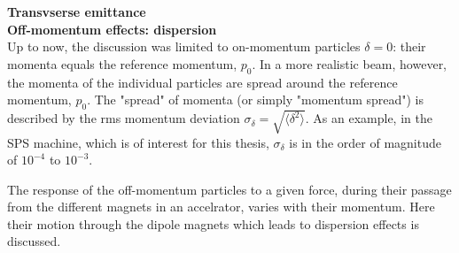 



\textbf{Transvserse emittance}\\
\textbf{Off-momentum effects: dispersion}\\
Up to now, the discussion was limited to on-momentum particles $\delta=0$: their momenta equals the reference momentum, $p_0$. In a more realistic beam, however, the momenta of the individual particles are spread around the reference momentum, $p_0$. The "spread" of momenta (or simply "momentum spread") is described by the rms momentum deviation $\sigma_\delta = \sqrt{\langle \delta^2 \rangle}$. As an example, in the SPS machine, which is of interest for this thesis, $\sigma_\delta$ is in the order of magnitude of $10^{-4}$ to $10^{-3}$.

The response of the off-momentum particles to a given force, during their passage from the different magnets in an accelrator, varies with their momentum. Here their motion through the dipole magnets which leads to dispersion effects is discussed. 

